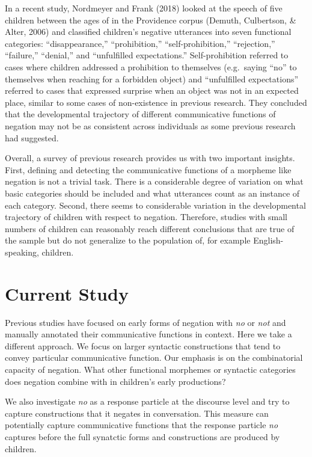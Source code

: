 \documentclass[
  english,
  man,floatsintext]{apa6}
\begin{document}
In a recent study, Nordmeyer and Frank (2018) looked at the speech of five children between the ages of in the Providence corpus (Demuth, Culbertson, \& Alter, 2006) and classified children's negative utterances into seven functional categories: ``disappearance,'' ``prohibition,'' ``self-prohibition,'' ``rejection,'' ``failure,'' ``denial,'' and ``unfulfilled expectations.'' Self-prohibition referred to cases where children addressed a prohibition to themselves (e.g.~saying ``no'' to themselves when reaching for a forbidden object) and ``unfulfilled expectations'' referred to cases that expressed surprise when an object was not in an expected place, similar to some cases of non-existence in previous research. They concluded that the developmental trajectory of different communicative functions of negation may not be as consistent across individuals as some previous research had suggested.

Overall, a survey of previous research provides us with two important insights. First, defining and detecting the communicative functions of a morpheme like negation is not a trivial task. There is a considerable degree of variation on what basic categories should be included and what utterances count as an instance of each category. Second, there seems to considerable variation in the developmental trajectory of children with respect to negation. Therefore, studies with small numbers of children can reasonably reach different conclusions that are true of the sample but do not generalize to the population of, for example English-speaking, children.

\hypertarget{current-study}{%
\section{Current Study}\label{current-study}}

Previous studies have focused on early forms of negation with \emph{no} or \emph{not} and manually annotated their communicative functions in context. Here we take a different approach. We focus on larger syntactic constructions that tend to convey particular communicative function. Our emphasis is on the combinatorial capacity of negation. What other functional morphemes or syntactic categories does negation combine with in children's early productions?

We also investigate \emph{no} as a response particle at the discourse level and try to capture constructions that it negates in conversation. This measure can potentially capture communicative functions that the response particle \emph{no} captures before the full synatctic forms and constructions are produced by children.
\end{document}
